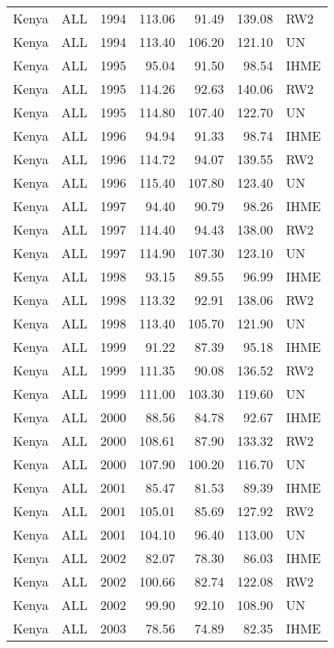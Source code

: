 \begin{longtable}{lllrrrl}
  Kenya & ALL & 1994 & 113.06 & 91.49 & 139.08 & RW2 \\ 
  Kenya & ALL & 1994 & 113.40 & 106.20 & 121.10 & UN \\ 
  Kenya & ALL & 1995 & 95.04 & 91.50 & 98.54 & IHME \\ 
  Kenya & ALL & 1995 & 114.26 & 92.63 & 140.06 & RW2 \\ 
  Kenya & ALL & 1995 & 114.80 & 107.40 & 122.70 & UN \\ 
  Kenya & ALL & 1996 & 94.94 & 91.33 & 98.74 & IHME \\ 
  Kenya & ALL & 1996 & 114.72 & 94.07 & 139.55 & RW2 \\ 
  Kenya & ALL & 1996 & 115.40 & 107.80 & 123.40 & UN \\ 
  Kenya & ALL & 1997 & 94.40 & 90.79 & 98.26 & IHME \\ 
  Kenya & ALL & 1997 & 114.40 & 94.43 & 138.00 & RW2 \\ 
  Kenya & ALL & 1997 & 114.90 & 107.30 & 123.10 & UN \\ 
  Kenya & ALL & 1998 & 93.15 & 89.55 & 96.99 & IHME \\ 
  Kenya & ALL & 1998 & 113.32 & 92.91 & 138.06 & RW2 \\ 
  Kenya & ALL & 1998 & 113.40 & 105.70 & 121.90 & UN \\ 
  Kenya & ALL & 1999 & 91.22 & 87.39 & 95.18 & IHME \\ 
  Kenya & ALL & 1999 & 111.35 & 90.08 & 136.52 & RW2 \\ 
  Kenya & ALL & 1999 & 111.00 & 103.30 & 119.60 & UN \\ 
  Kenya & ALL & 2000 & 88.56 & 84.78 & 92.67 & IHME \\ 
  Kenya & ALL & 2000 & 108.61 & 87.90 & 133.32 & RW2 \\ 
  Kenya & ALL & 2000 & 107.90 & 100.20 & 116.70 & UN \\ 
  Kenya & ALL & 2001 & 85.47 & 81.53 & 89.39 & IHME \\ 
  Kenya & ALL & 2001 & 105.01 & 85.69 & 127.92 & RW2 \\ 
  Kenya & ALL & 2001 & 104.10 & 96.40 & 113.00 & UN \\ 
  Kenya & ALL & 2002 & 82.07 & 78.30 & 86.03 & IHME \\ 
  Kenya & ALL & 2002 & 100.66 & 82.74 & 122.08 & RW2 \\ 
  Kenya & ALL & 2002 & 99.90 & 92.10 & 108.90 & UN \\ 
  Kenya & ALL & 2003 & 78.56 & 74.89 & 82.35 & IHME \\ 

\end{longtable}
